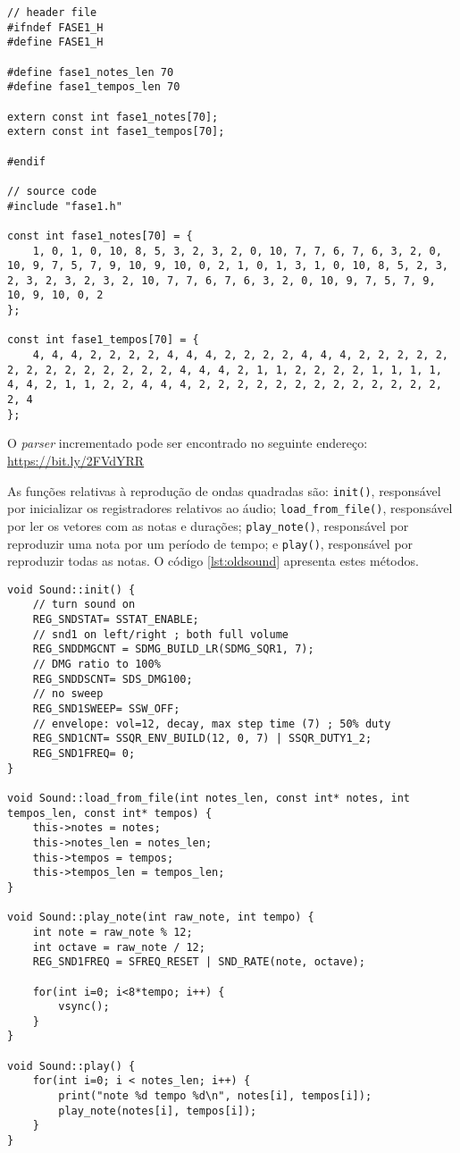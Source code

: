 \begin{lstlisting}[caption={Código gerado com notas e durações.},label={lst:notastempos}]
// header file
#ifndef FASE1_H
#define FASE1_H

#define fase1_notes_len 70
#define fase1_tempos_len 70

extern const int fase1_notes[70];
extern const int fase1_tempos[70];

#endif

// source code
#include "fase1.h"

const int fase1_notes[70] = {
	1, 0, 1, 0, 10, 8, 5, 3, 2, 3, 2, 0, 10, 7, 7, 6, 7, 6, 3, 2, 0, 10, 9, 7, 5, 7, 9, 10, 9, 10, 0, 2, 1, 0, 1, 3, 1, 0, 10, 8, 5, 2, 3, 2, 3, 2, 3, 2, 3, 2, 10, 7, 7, 6, 7, 6, 3, 2, 0, 10, 9, 7, 5, 7, 9, 10, 9, 10, 0, 2
};

const int fase1_tempos[70] = {
	4, 4, 4, 2, 2, 2, 2, 4, 4, 4, 2, 2, 2, 2, 4, 4, 4, 2, 2, 2, 2, 2, 2, 2, 2, 2, 2, 2, 2, 2, 2, 4, 4, 4, 2, 1, 1, 2, 2, 2, 2, 1, 1, 1, 1, 4, 4, 2, 1, 1, 2, 2, 4, 4, 4, 2, 2, 2, 2, 2, 2, 2, 2, 2, 2, 2, 2, 2, 2, 4
};
\end{lstlisting}

O \textit{parser} incrementado pode ser encontrado no seguinte endereço: \url{https://bit.ly/2FVdYRR}

As funções relativas à reprodução de ondas quadradas são: \texttt{init()}, responsável por inicializar os registradores relativos ao áudio; \texttt{load\_from\_file()}, responsável por ler os vetores com as notas e durações; \texttt{play\_note()}, responsável por reproduzir uma nota por um período de tempo; e \texttt{play()}, responsável por reproduzir todas as notas. O código \ref{lst:oldsound} apresenta estes métodos.

\begin{lstlisting}[caption={Reprodução de notas e durações},label={lst:oldsound}]
void Sound::init() {
	// turn sound on
	REG_SNDSTAT= SSTAT_ENABLE;
	// snd1 on left/right ; both full volume
	REG_SNDDMGCNT = SDMG_BUILD_LR(SDMG_SQR1, 7);
	// DMG ratio to 100%
	REG_SNDDSCNT= SDS_DMG100;
	// no sweep
	REG_SND1SWEEP= SSW_OFF;
	// envelope: vol=12, decay, max step time (7) ; 50% duty
	REG_SND1CNT= SSQR_ENV_BUILD(12, 0, 7) | SSQR_DUTY1_2;
	REG_SND1FREQ= 0;
}

void Sound::load_from_file(int notes_len, const int* notes, int tempos_len, const int* tempos) {
    this->notes = notes;
    this->notes_len = notes_len;
    this->tempos = tempos;
    this->tempos_len = tempos_len;
}

void Sound::play_note(int raw_note, int tempo) {
	int note = raw_note % 12;
	int octave = raw_note / 12;
	REG_SND1FREQ = SFREQ_RESET | SND_RATE(note, octave);

	for(int i=0; i<8*tempo; i++) {
		vsync();
	}
}

void Sound::play() {
	for(int i=0; i < notes_len; i++) {
		print("note %d tempo %d\n", notes[i], tempos[i]);
		play_note(notes[i], tempos[i]);
	}
}
\end{lstlisting}



